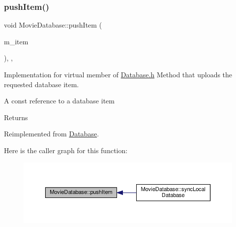 \mbox{\label{classMovieDatabase_a203b9b5c1b325997ce519859a436b6ce}} 
\subsubsection{\texorpdfstring{push\+Item()}{pushItem()}}
{\footnotesize\ttfamily void Movie\+Database\+::push\+Item (\begin{DoxyParamCaption}\item[{const \hyperlink{classDatabaseItem}{Database\+Item} \&}]{m\+\_\+item }\end{DoxyParamCaption})\hspace{0.3cm}{\ttfamily [inline]}, {\ttfamily [override]}, {\ttfamily [virtual]}}



Implementation for virtual member of \hyperlink{Database_8h_source}{Database.\+h} Method that uploads the requested database item. 

A const reference to a database item

\begin{DoxyReturn}{Returns}

\end{DoxyReturn}


Reimplemented from \hyperlink{classDatabase_a80fa14ab9f4deadc9a2ab7493f1919a4}{Database}.

Here is the caller graph for this function\+:\nopagebreak
\begin{figure}[H]
\begin{center}
\leavevmode
\includegraphics[width=350pt]{classMovieDatabase_a203b9b5c1b325997ce519859a436b6ce_icgraph}
\end{center}
\end{figure}
\mbox{\label{classMovieDatabase_aee175db6a2a357b6180fcab5d57eddd5}} 
